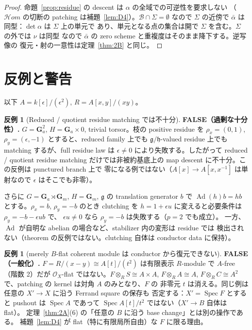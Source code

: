 \documentclass[11pt,a4paper]{article}
\numberwithin{equation}{section}
\theoremstyle{definition}
\newtheorem{counterexample}[definition]{反例}
\DeclareMathOperator{\Ad}{Ad}
\newcommand{\OO}{\mathcal O}
\newcommand{\g}{\mathfrak g}
\newcommand{\h}{\mathfrak h}
\begin{document}
\begin{proof}
命題~\ref{prop:residue} の descent は $\alpha$ の全域での可逆性を要求しない
（$\mathcal Hom$ の切断の patching は補題~\ref{lem:D4}）。$\mathcal B\cap\Sigma=\emptyset$
なので $\Sigma$ の近傍で $\bar\alpha$ は同型：$\det\alpha$ は $\Sigma$ 上の単元で
あり、単元となる点の集合は開で $\Sigma$ を含む。$\Sigma$ の外では $\nu$ は同型
なので $\bar\alpha$ の zero scheme と重複度はそのまま降下する。逆写像の
復元・射の一意性は定理~\ref{thm:2B} と同じ。
\end{proof}

\section{反例と警告}\label{sec:cex}

以下 $A=k[\epsilon]/(\epsilon^2)$, $R=A[x,y]/(xy)$。

\begin{counterexample}[Reduced / quotient residue matching では不十分]
\label{cex:reduced}
\textbf{FALSE（過剰な十分性）.}
$G=\mathbf G_a^2$, $H=\mathbf G_a\times0$, trivial torsor。枝の positive
residue を $\rho_x=(0,1)$, $\rho_y=(\epsilon,-1)$ とすると、reduced family 上でも
$\g/\h$-valued residue 上でも matching するが、full residue law は
$\epsilon\neq0$ により失敗する。したがって reduced / quotient residue matching
だけでは非被約基底上の map descent に不十分。この反例は punctured branch 上で
零になる例ではない（$A[x]\to A[x,x^{-1}]$ は単射なので $\epsilon$ はそこでも非零）。

さらに $G=\mathbf G_a\rtimes\mathbf G_m$, $H=\mathbf G_m$, $\g$ の translation
generator $b$ で $\Ad(h)b=hb$ とする。$\rho_x=b$, $\rho_y=-b$ のとき clutching を
$h=1+\epsilon u$ に変えると必要条件は $\rho_y=-b-\epsilon ub$ で、
$\epsilon u\ne0$ なら $\rho_y=-b$ は失敗する（$p=2$ でも成立）。
一方、$\Ad$ が自明な abelian の場合など、stabilizer 内の変形は residue では
検出されない（theorem の反例ではない。clutching 自体は conductor data に保持）。
\end{counterexample}

\begin{counterexample}[merely $B$-flat coherent module は conductor から復元できない]
\label{cex:Xbc}
\textbf{FALSE（一般化）.}
$F=R/(x-y)\cong A[t]/(t^2)$ は有限表示 $R$-module で $A$-free（階数 2）だが
$\OO_X$-flat ではない。$F\otimes_RS\cong A\times A$, $F\otimes_RA\cong A$,
$F\otimes_RC\cong A^2$ で、patching の kernel は対角 $A$ のみとなり、$F$ の
非零元 $t$ は消える。同じ例は任意の $X'\to X$ に沿う Ferrand square の保存も
否定する：$X'=\operatorname{Spec}F$ とすると pushout は $\operatorname{Spec}A$
であって $\operatorname{Spec}A[t]/t^2$ ではない（$X'\to B$ 自体は flat）。
定理~\ref{thm:2A}(6) の「任意の $B$ に沿う base change」とは別の操作である。
補題~\ref{lem:D4} が flat（特に有限局所自由）な $F$ に限る理由。
\end{counterexample}
\end{document}
